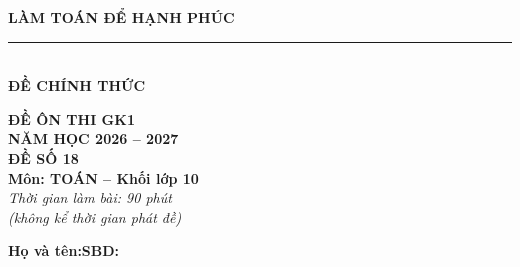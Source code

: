 \documentclass[12pt,a4paper]{article}
\begin{document}
\noindent
\begin{minipage}[c]{0.38\textwidth}
    \centering
    \textbf{LÀM TOÁN ĐỂ HẠNH PHÚC}\\[-2pt]
    \rule{3.2cm}{0.6pt}\\[4pt]
    \textbf{ĐỀ CHÍNH THỨC}
\end{minipage}\hfill
\begin{minipage}[c]{0.35\textwidth}
    \centering
    \textbf{ĐỀ ÔN THI GK1}\\
    \textbf{NĂM HỌC 2026 -- 2027}\\[2pt]
    \textbf{ĐỀ SỐ 18}\\
    \textbf{Môn: TOÁN -- Khối lớp 10}\\
    \textit{\small Thời gian làm bài: 90 phút\\(không kể thời gian phát đề)}
\end{minipage}

\vspace{0.2cm}
\noindent
\begin{minipage}[b]{0.78\textwidth}
    \textbf{Họ và tên:}\dotfill\textbf{SBD:}\makebox[3.5cm]{\dotfill}
\end{minipage}\hfill
\begin{minipage}[b]{0.20\textwidth}
    \hfill
    \setlength{\fboxrule}{0.8pt}%
\end{minipage}
\vspace{0.2cm}
\end{document}
